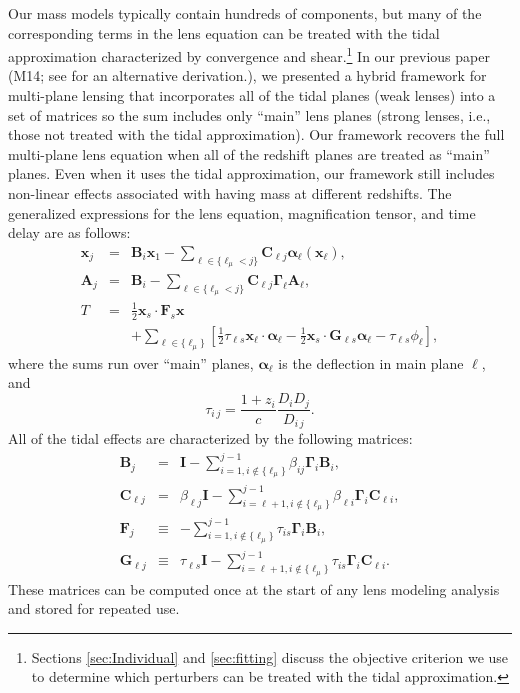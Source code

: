 \documentclass{emulateapj}
\newcommand\A[0]{\mathbf{A}}
\newcommand\B[0]{\mathbf{B}}
\newcommand\C[0]{\mathbf{C}}
\newcommand\I[0]{\mathbf{I}}
\newcommand\F[0]{\mathbf{F}}
\newcommand\G[0]{\mathbf{G}}
\newcommand\GammaMat[0]{\boldsymbol{\Gamma}}
\newcommand\x[0]{\mathbf{x}}
\newcommand\al[0]{\boldsymbol{\alpha}}
\begin{document}
Our mass models typically contain hundreds of components, but many of the corresponding terms in the lens equation can be treated with the tidal approximation characterized by convergence and shear.\footnote{Sections \ref{sec:Individual} and \ref{sec:fitting} discuss the objective criterion we use to determine which perturbers can be treated with the tidal approximation.}  In our previous paper (M14; see \citealt{Schneider14} for an alternative derivation.), we presented a hybrid framework for multi-plane lensing that incorporates all of the tidal planes (weak lenses) into a set of matrices so the sum includes only ``main'' lens planes (strong lenses, i.e., those not treated with the tidal approximation). Our framework recovers the full multi-plane lens equation when all of the redshift planes are treated as ``main'' planes. Even when it uses the tidal approximation, our framework still includes non-linear effects associated with having mass at different redshifts.  The generalized expressions for the lens equation, magnification tensor, and time delay are as follows:
\begin{eqnarray}
\x_{j} &=& \B_i \x_1 - \sum_{\ell \in \{\ell_\mu<j\}} \C_{\ell j} \al_\ell(\x_\ell),\label{eqn:lenseqn}\\
\A_{j} &=& \B_i - \sum_{\ell \in \{\ell_\mu<j\}} \C_{\ell j} \GammaMat_\ell \A_\ell,\\
T &=& \frac{1}{2} \x_s \cdot \F_s \x \nonumber \\
&&+ \sum\limits_{\ell \in \{\ell_\mu\}}\left[\frac{1}{2}\tau_{\ell s} \x_\ell \cdot \al_\ell -\frac{1}{2}\x_s \cdot \G_{\ell s}\al_\ell -\tau_{\ell s}\phi_\ell \right],
\end{eqnarray}
where the sums run over ``main'' planes, $\al_\ell$ is the deflection in main plane $\ell$, and  
\begin{equation}
\tau_{i\,j} = \frac{ 1 + z_i}{c} \frac{D_i D_j}{D_{i\,j}}.
\end{equation}
All of the tidal effects are characterized by the following matrices:
\begin{eqnarray}
\B_j &=& \I - \sum\limits_{i=1,i\not \in \{\ell_\mu\}}^{j-1}\beta_{ij}\GammaMat_i \B_i, \\
\C_{\ell j} &=& \beta_{\ell j} \I - \sum\limits_{i=\ell+1, i\not\in\{\ell_\mu\}}^{j-1} \beta_{\ell i}\GammaMat_i\C_{\ell i}, \label{eqn:cmatdef}\\
\F_j &\equiv& 
  - \sum\limits_{i=1,i\not \in \{\ell_\mu\}}^{j-1} \tau_{is}\GammaMat_i\B_i, \\
\G_{\ell j}&\equiv& 
 \tau_{\ell s}\I- \sum\limits_{i=\ell+1,i \not \in \{\ell_\mu\}}^{j-1} \tau_{is}\GammaMat_i\C_{\ell i}.
\end{eqnarray}
These matrices can be computed once at the start of any lens modeling analysis and stored for repeated use.
\end{document}
